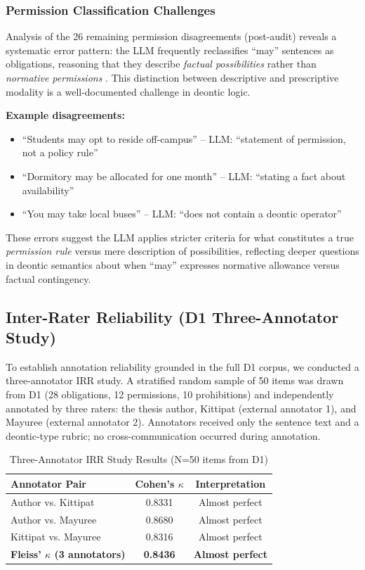 \subsubsection{Permission Classification Challenges}

Analysis of the 26 remaining permission disagreements (post-audit) reveals a systematic error pattern: the LLM frequently reclassifies ``may'' sentences as obligations, reasoning that they describe \textit{factual possibilities} rather than \textit{normative permissions} \citep{kratzer2012modals}. This distinction between descriptive and prescriptive modality is a well-documented challenge in deontic logic.

\textbf{Example disagreements:}
\begin{itemize}
    \item ``Students may opt to reside off-campus'' -- LLM: ``statement of permission, not a policy rule''
    \item ``Dormitory may be allocated for one month'' -- LLM: ``stating a fact about availability''
    \item ``You may take local buses'' -- LLM: ``does not contain a deontic operator''
\end{itemize}

These errors suggest the LLM applies stricter criteria for what constitutes a true \textit{permission rule} versus mere description of possibilities, reflecting deeper questions in deontic semantics about when ``may'' expresses normative allowance versus factual contingency.

\subsection{Inter-Rater Reliability (D1 Three-Annotator Study)}
\label{sec:irr-type}

To establish annotation reliability grounded in the full D1 corpus, we conducted a three-annotator IRR study. A stratified random sample of 50 items was drawn from D1 (28 obligations, 12 permissions, 10 prohibitions) and independently annotated by three raters: the thesis author, Kittipat (external annotator 1), and Mayuree (external annotator 2). Annotators received only the sentence text and a deontic-type rubric; no cross-communication occurred during annotation.

\begin{table}[htbp]
\centering
\caption{Three-Annotator IRR Study Results (N=50 items from D1)}
\label{tab:irr-three-annotator}
\begin{tabular}{lcc}
\toprule
\textbf{Annotator Pair} & \textbf{Cohen's $\kappa$} & \textbf{Interpretation} \\
\midrule
Author vs. Kittipat & 0.8331 & Almost perfect \\
Author vs. Mayuree & 0.8680 & Almost perfect \\
Kittipat vs. Mayuree & 0.8316 & Almost perfect \\
\midrule
\textbf{Fleiss' $\kappa$ (3 annotators)} & \textbf{0.8436} & \textbf{Almost perfect} \\
\bottomrule
\end{tabular}
\end{table}

